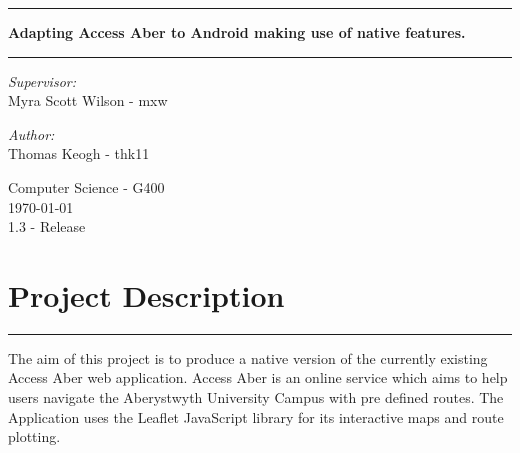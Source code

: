 \documentclass[10pt,a4paper]{article}
\begin{document}
\begin{titlepage}
\center
\hrule
\vspace{0.3cm}

\huge
\textbf{  Adapting Access Aber to Android making use of native features.}
\vspace{0.3cm}
\hrule
\vspace{0.6cm}
\large


\begin{minipage}{0.4\textwidth}
  \textit{Supervisor:\\}
  Myra Scott Wilson - mxw
\end{minipage}

\begin{minipage}{0.4\textwidth}
\begin{flushright}
 \textit{Author:\\}
 Thomas Keogh - thk11
 \end{flushright}
\end{minipage}



\vspace{1cm}


\vspace{0.1cm}

Computer Science - G400
\\
\vspace{0.1cm}
\today \\
\vspace{0.1cm}
1.3 - Release


\end{titlepage}




\section{Project Description}
\vspace{0.2cm}
\hrule
\vspace{0.4cm}

The aim of this project is to produce a native version of the currently existing Access Aber web application. Access Aber is an online service which aims to help users navigate the Aberystwyth University Campus with pre defined routes. The Application uses the Leaflet JavaScript library for its interactive maps and route plotting. 
\end{document}
